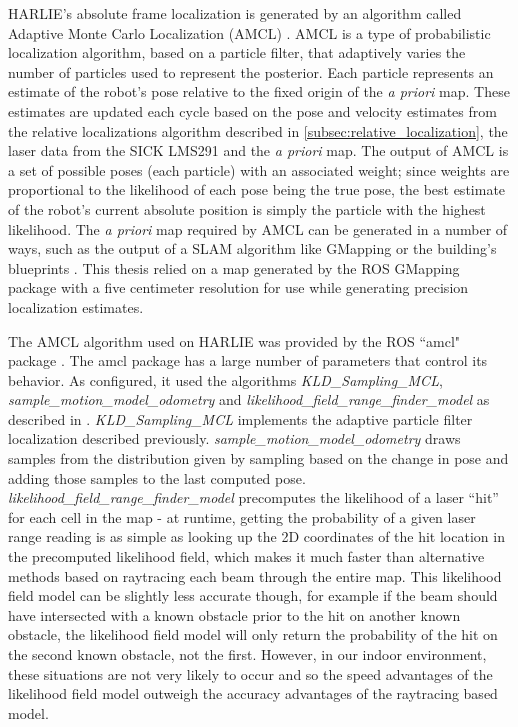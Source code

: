 HARLIE's absolute frame localization is generated by an algorithm called Adaptive Monte Carlo Localization (AMCL) \autocites{Dellaert_1999_533}{Fox01122003}{ProbRobotics}. AMCL is a type of probabilistic localization algorithm, based on a particle filter, that adaptively varies the number of particles used to represent the posterior. Each particle represents an estimate of the robot's pose relative to the fixed origin of the \emph{a priori} map. These estimates are updated each cycle based on the pose and velocity estimates from the relative localizations algorithm described in \autoref{subsec:relative_localization}, the laser data from the SICK LMS291 and the \emph{a priori} map. The output of AMCL is a set of possible poses (each particle) with an associated weight; since weights are proportional to the likelihood of each pose being the true pose, the best estimate of the robot's current absolute position is simply the particle with the highest likelihood. The \emph{a priori} map required by AMCL can be generated in a number of ways, such as the output of a SLAM algorithm like GMapping \autocite{Grisetti07improvedtechniques} or the building's blueprints \autocite{Fish2012}. This thesis relied on a map generated by the ROS GMapping package with a five centimeter resolution for use while generating precision localization estimates.

The AMCL algorithm used on HARLIE was provided by the ROS ``amcl" package \autocite{AMCLWiki}. The amcl package has a large number of parameters that control its behavior. As configured, it used the algorithms \emph{KLD\_Sampling\_MCL}, \emph{sample\_motion\_model\_odometry} and \emph{likelihood\_field\_range\_finder\_model} as described in \autocite{ProbRobotics}. \emph{KLD\_Sampling\_MCL} implements the adaptive particle filter localization described previously. \emph{sample\_motion\_model\_odometry} draws samples from the distribution given by sampling based on the change in pose and adding those samples to the last computed pose. \emph{likelihood\_field\_range\_finder\_model} precomputes the likelihood of a laser ``hit'' for each cell in the map - at runtime, getting the probability of a given laser range reading is as simple as looking up the 2D coordinates of the hit location in the precomputed likelihood field, which makes it much faster than alternative methods based on raytracing each beam through the entire map. This likelihood field model can be slightly less accurate though, for example if the beam should have intersected with a known obstacle prior to the hit on another known obstacle, the likelihood field model will only return the probability of the hit on the second known obstacle, not the first. However, in our indoor environment, these situations are not very likely to occur and so the speed advantages of the likelihood field model outweigh the accuracy advantages of the raytracing based model.

